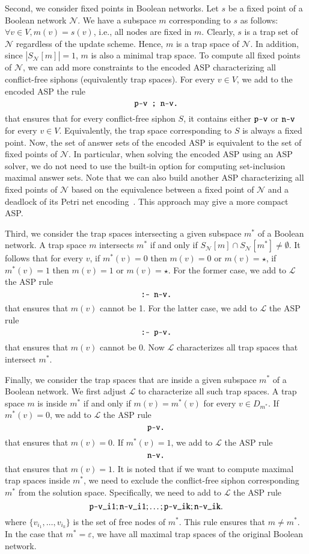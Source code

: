 \documentclass[preprint,12pt]{elsarticle}
\begin{document}
Second, we consider fixed points in Boolean networks.
Let \(s\) be a fixed point of a Boolean network \(\mathcal{N}\).
We have a subspace \(m\) corresponding to \(s\) as follows: \(\forall v \in V, m(v) = s(v)\), i.e., all nodes are fixed in \(m\).
Clearly, \(s\) is a trap set of \(\mathcal{N}\) regardless of the update scheme.
Hence, \(m\) is a trap space of \(\mathcal{N}\).
In addition, since \(\left\vert S_{\mathcal{N}}[m]\right\vert = 1\), \(m\) is also a minimal trap space.
To compute all fixed points of \(\mathcal{N}\), we can add more constraints to the encoded ASP characterizing all conflict-free siphons (equivalently trap spaces).
For every \(v \in V\), we add to the encoded ASP the rule
\[
  \verb|p-v ; n-v.|
\]
that ensures that for every conflict-free siphon \(S\), it contains either \(\verb|p-v|\) or \(\verb|n-v|\) for every \(v \in V\).
Equivalently, the trap space corresponding to \(S\) is always a fixed point.
Now, the set of answer sets of the encoded ASP is equivalent to the set of fixed points of \(\mathcal{N}\).
In particular, when solving the encoded ASP using an ASP solver, we do not need to use the built-in option for computing set-inclusion maximal answer sets.
Note that we can also build another ASP characterizing all fixed points of \(\mathcal{N}\) based on the equivalence between a fixed point of \(\mathcal{N}\) and a deadlock of its Petri net encoding~\cite{chatain2014characterization}.
This approach may give a more compact ASP.

Third, we consider the trap spaces intersecting a given subspace \(m^{*}\) of a Boolean network.
A trap space \(m\) intersects \(m^{*}\) if and only if \(S_{\mathcal{N}}[m] \cap S_{\mathcal{N}}[m^{*}] \neq \emptyset\).
It follows that for every \(v\), if \(m^{*}(v) = 0\) then \(m(v) = 0\) or \(m(v) = \star\), if \(m^{*}(v) = 1\) then \(m(v) = 1\) or \(m(v) = \star\).
For the former case, we add to \(\mathcal{L}\) the ASP rule
\[
  \verb|:- n-v.|
\]
that ensures that \(m(v)\) cannot be 1.
For the latter case, we add to \(\mathcal{L}\) the ASP rule
\[
  \verb|:- p-v.|
\]
that ensures that \(m(v)\) cannot be 0.
Now \(\mathcal{L}\) characterizes all trap spaces that intersect \(m^{*}\).

Finally, we consider the trap spaces that are inside a given subspace \(m^{*}\) of a Boolean network.
We first adjust \(\mathcal{L}\) to characterize all such trap spaces.
A trap space \(m\) is inside \(m^{*}\) if and only if \(m(v) = m^{*}(v)\) for every \(v \in D_{m^{*}}\).
If \(m^{*}(v) = 0\), we add to \(\mathcal{L}\) the ASP rule
\[
  \verb|p-v.|
\]
that ensures that \(m(v) = 0\).
If \(m^{*}(v) = 1\), we add to \(\mathcal{L}\) the ASP rule
\[
  \verb|n-v.|
\]
that ensures that \(m(v) = 1\).
It is noted that if we want to compute maximal trap spaces inside \(m^{*}\), we need to exclude the conflict-free siphon corresponding \(m^{*}\) from the solution space.
Specifically, we need to add to \(\mathcal{L}\) the ASP rule
\[
  \verb|p-v_i1| ; \verb|n-v_i1| ; \dots ; \verb|p-v_ik| ; \verb|n-v_ik|.
\]
where \(\{v_{i_1}, \dots, v_{i_k}\}\) is the set of free nodes of \(m^{*}\).
This rule ensures that \(m \neq m^{*}\).
In the case that \(m^{*} = \varepsilon\), we have all maximal trap spaces of the original Boolean network.
\end{document}
